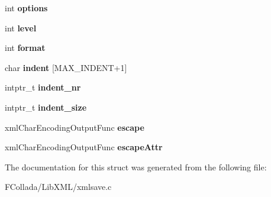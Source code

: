 \begin{DoxyCompactItemize}
\item 
\hypertarget{struct__xmlSaveCtxt_a7cd2dae14f3dbfbc89898d0e573e71d4}{
int {\bfseries options}}
\label{struct__xmlSaveCtxt_a7cd2dae14f3dbfbc89898d0e573e71d4}

\item 
\hypertarget{struct__xmlSaveCtxt_a515d771b71fa24d6720cdb2ba9ef194b}{
int {\bfseries level}}
\label{struct__xmlSaveCtxt_a515d771b71fa24d6720cdb2ba9ef194b}

\item 
\hypertarget{struct__xmlSaveCtxt_a603e0b5ae7a1f025b3a21d59185c42ee}{
int {\bfseries format}}
\label{struct__xmlSaveCtxt_a603e0b5ae7a1f025b3a21d59185c42ee}

\item 
\hypertarget{struct__xmlSaveCtxt_a9cb7073f8110f2290d8c4932876d4493}{
char {\bfseries indent} \mbox{[}MAX\_\-INDENT+1\mbox{]}}
\label{struct__xmlSaveCtxt_a9cb7073f8110f2290d8c4932876d4493}

\item 
\hypertarget{struct__xmlSaveCtxt_a11c39e0068ddb16a7d5252061fd0bf16}{
intptr\_\-t {\bfseries indent\_\-nr}}
\label{struct__xmlSaveCtxt_a11c39e0068ddb16a7d5252061fd0bf16}

\item 
\hypertarget{struct__xmlSaveCtxt_a2649fd5a0ca760310b10f3d2e20cc621}{
intptr\_\-t {\bfseries indent\_\-size}}
\label{struct__xmlSaveCtxt_a2649fd5a0ca760310b10f3d2e20cc621}

\item 
\hypertarget{struct__xmlSaveCtxt_af86703aad28495c97bbf74ae2efce316}{
xmlCharEncodingOutputFunc {\bfseries escape}}
\label{struct__xmlSaveCtxt_af86703aad28495c97bbf74ae2efce316}

\item 
\hypertarget{struct__xmlSaveCtxt_afae2b3816f091cc12912ec411f884250}{
xmlCharEncodingOutputFunc {\bfseries escapeAttr}}
\label{struct__xmlSaveCtxt_afae2b3816f091cc12912ec411f884250}

\end{DoxyCompactItemize}


The documentation for this struct was generated from the following file:\begin{DoxyCompactItemize}
\item 
FCollada/LibXML/xmlsave.c\end{DoxyCompactItemize}
